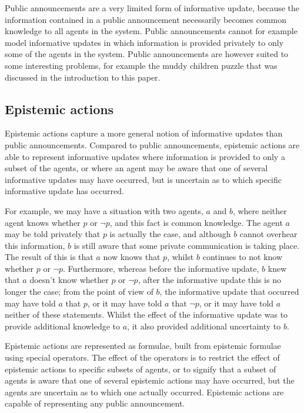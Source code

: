 Public announcements are a very limited form of informative update, because the
information contained in a public announcement necessarily becomes common
knowledge to all agents in the system. Public announcements cannot for example
model informative updates in which information is provided privately to only
some of the agents in the system. Public announcements are however suited to
some interesting problems, for example the muddy children puzzle that was
discussed in the introduction to this paper.

\subsection{Epistemic actions}

Epistemic actions capture a more general notion of informative updates than
public announcements. Compared to public announcements, epistemic actions are
able to represent informative updates where information is provided to only a
subset of the agents, or where an agent may be aware that one of several
informative updates may have occurred, but is uncertain as to which specific
informative update has occurred. 

For example, we may have a situation with two agents, $a$ and $b$, where neither
agent knows whether $p$ or $\neg p$, and this fact is common knowledge. The
agent $a$ may be told privately that $p$ is actually the case, and although $b$
cannot overhear this information, $b$ is still aware that some private
communication is taking place. The result of this is that $a$ now knows that
$p$, whilst $b$ continues to not know whether $p$ or $\neg p$. Furthermore,
whereas before the informative update, $b$ knew that $a$ doesn't know whether
$p$ or $\neg p$, after the informative update this is no longer the case; from
the point of view of $b$, the informative update that occurred may have told $a$
that $p$, or it may have told $a$ that $\neg p$, or it may have told $a$
neither of these statements. Whilst the effect of the informative update was to
provide additional knowledge to $a$, it also provided additional uncertainty to
$b$.

Epistemic actions are represented as formulae, built from epistemic formulae
using special operators. The effect of the operators is to restrict the effect
of epistemic actions to specific subsets of agents, or to signify that a subset
of agents is aware that one of several epistemic actions may have occurred, but
the agents are uncertain as to which one actually occurred. Epistemic actions
are capable of representing any public announcement.

